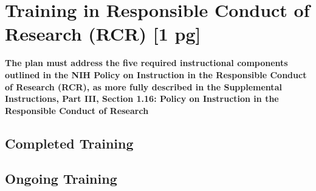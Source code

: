 \documentclass[11pt]{article}
\begin{document}
\section*{Training in Responsible Conduct of Research (RCR) [1 pg]}

\textbf{The plan must address the five required instructional components outlined in the NIH Policy on Instruction in the Responsible Conduct of Research (RCR), as more fully described in the Supplemental Instructions, Part III, Section 1.16: Policy on Instruction in the Responsible Conduct of Research}

\subsection*{Completed Training} 
\lipsum[1-3]

\subsection*{Ongoing Training}
\lipsum[4-6]
\end{document}
